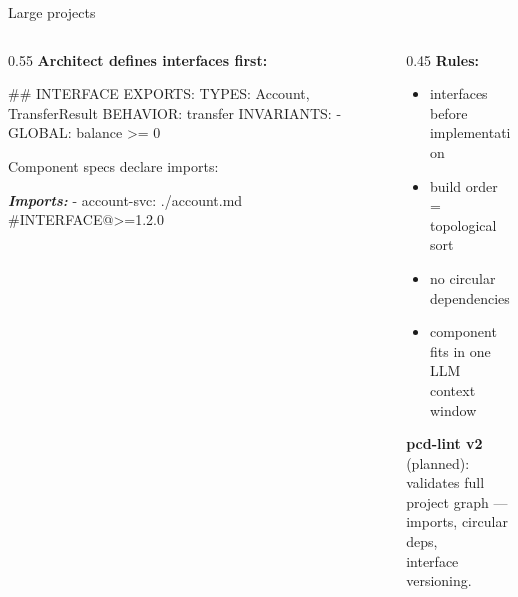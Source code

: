 \documentclass[
  10pt,
  ignorenonframetext,
  aspectratio=169,
  10pt]{beamer}
\newenvironment{Shaded}{}{}
\newcommand{\AnnotationTok}[1]{\textcolor[rgb]{0.38,0.63,0.69}{\textbf{\textit{#1}}}}
\newcommand{\FunctionTok}[1]{\textcolor[rgb]{0.02,0.16,0.49}{#1}}
\newcommand{\NormalTok}[1]{#1}
\newcommand{\SpecialStringTok}[1]{\textcolor[rgb]{0.73,0.40,0.53}{#1}}
\providecommand{\tightlist}{%
  \setlength{\itemsep}{0pt}\setlength{\parskip}{0pt}}
\begin{document}
\begin{frame}[fragile]{Large projects}
\protect\hypertarget{large-projects}{}
\begin{columns}[T]
\begin{column}{0.55\textwidth}
\textbf{Architect defines interfaces first:}

\begin{Shaded}
\begin{Highlighting}[]
\FunctionTok{\#\# INTERFACE}
\NormalTok{EXPORTS:}
\NormalTok{  TYPES:  Account, TransferResult}
\NormalTok{  BEHAVIOR: transfer}
\NormalTok{  INVARIANTS:}
\SpecialStringTok{    {-} }\NormalTok{GLOBAL: balance \textgreater{}= 0}
\end{Highlighting}
\end{Shaded}

\bigskip

Component specs declare imports:

\begin{Shaded}
\begin{Highlighting}[]
\AnnotationTok{Imports:}
\SpecialStringTok{  {-} }\NormalTok{account{-}svc: ./account.md}
\NormalTok{                 \#INTERFACE@\textgreater{}=1.2.0}
\end{Highlighting}
\end{Shaded}
\end{column}

\begin{column}{0.45\textwidth}
\textbf{Rules:}

\begin{itemize}
\tightlist
\item
  interfaces before implementation
\item
  build order = topological sort
\item
  no circular dependencies
\item
  component fits in one LLM\\
  context window
\end{itemize}

\bigskip

\textbf{pcd-lint v2} (planned):\\
validates full project graph ---\\
imports, circular deps,\\
interface versioning.
\end{column}
\end{columns}
\end{frame}
\end{document}
